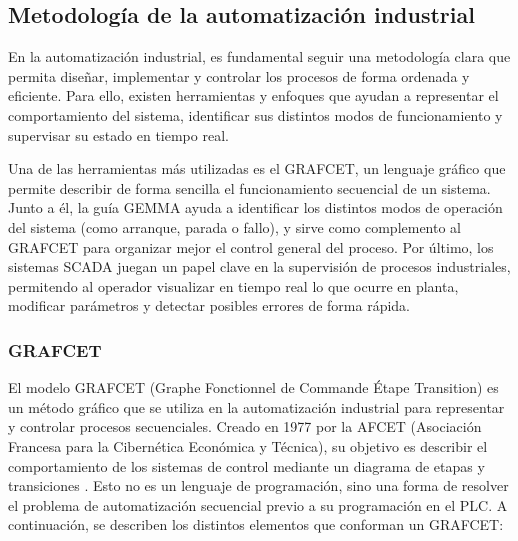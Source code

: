 \subsection{Metodología de la automatización industrial}

En la automatización industrial, es fundamental seguir una metodología clara que permita diseñar, implementar y controlar los procesos de forma ordenada y eficiente. Para ello, existen herramientas y enfoques que ayudan a representar el comportamiento del sistema, identificar sus distintos modos de funcionamiento y supervisar su estado en tiempo real.

Una de las herramientas más utilizadas es el GRAFCET, un lenguaje gráfico que permite describir de forma sencilla el funcionamiento secuencial de un sistema. Junto a él, la guía GEMMA ayuda a identificar los distintos modos de operación del sistema (como arranque, parada o fallo), y sirve como complemento al GRAFCET para organizar mejor el control general del proceso. Por último, los sistemas SCADA juegan un papel clave en la supervisión de procesos industriales, permitendo al operador visualizar en tiempo real lo que ocurre en planta, modificar parámetros y detectar posibles errores de forma rápida.

\subsubsection{GRAFCET}

El modelo GRAFCET (Graphe Fonctionnel de Commande Étape Transition) es un método gráfico que se utiliza en la automatización industrial para representar y controlar procesos secuenciales. Creado en 1977 por la AFCET (Asociación Francesa para la Cibernética Económica y Técnica), su objetivo es describir el comportamiento de los sistemas de control mediante un diagrama de etapas y transiciones \cite{grafcet_info}. Esto no es un lenguaje de programación, sino una forma de resolver el problema de automatización secuencial previo a su programación en el PLC. A continuación, se describen los distintos elementos que conforman un GRAFCET:

